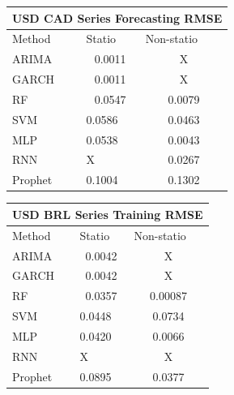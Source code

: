 \documentclass[10pt,twocolumn,letterpaper]{article}
\begin{document}
	\begin{table}[h]
		\label{table:usdcadforecastRMSE}
		\centering
		\begin{tabular}{|lll|}
			\hline
			\multicolumn{3}{|c|}{USD CAD Series Forecasting RMSE}                                                  \\ \hline
			\multicolumn{1}{|l|}{Method}  & \multicolumn{1}{l|}{Statio} & Non-statio             \\ \hline
			\multicolumn{1}{|l|}{ARIMA}   & \multicolumn{1}{c|}{0.0011}       & \multicolumn{1}{c|}{X} \\ \hline
			\multicolumn{1}{|l|}{GARCH}   & \multicolumn{1}{c|}{0.0011}       & \multicolumn{1}{c|}{X} \\ \hline
			\multicolumn{1}{|l|}{RF}      & \multicolumn{1}{c|}{0.0547}       & \multicolumn{1}{c|}{0.0079}  \\ \hline
			\multicolumn{1}{|l|}{SVM}     & \multicolumn{1}{l|}{0.0586}       & \multicolumn{1}{c|}{0.0463}  \\ \hline
			\multicolumn{1}{|l|}{MLP}     & \multicolumn{1}{l|}{0.0538}       & \multicolumn{1}{c|}{0.0043}  \\ \hline
			\multicolumn{1}{|l|}{RNN}     & \multicolumn{1}{l|}{X}       & \multicolumn{1}{c|}{0.0267}  \\ \hline
			\multicolumn{1}{|l|}{Prophet} & \multicolumn{1}{l|}{0.1004}       & \multicolumn{1}{c|}{0.1302}  \\ \hline
		\end{tabular}
	\end{table}
	
	\begin{table}[h]\label{table:usdbrltrainingRMSE}
		\centering
		\begin{tabular}{|lll|}
			\hline
			\multicolumn{3}{|c|}{USD BRL Series Training RMSE}                                                  \\ \hline
			\multicolumn{1}{|l|}{Method}  & \multicolumn{1}{l|}{Statio} & Non-statio             \\ \hline
			\multicolumn{1}{|l|}{ARIMA}   & \multicolumn{1}{c|}{0.0042}       & \multicolumn{1}{c|}{X} \\ \hline
			\multicolumn{1}{|l|}{GARCH}   & \multicolumn{1}{c|}{0.0042}       & \multicolumn{1}{c|}{X} \\ \hline
			\multicolumn{1}{|l|}{RF}      & \multicolumn{1}{c|}{0.0357}       & \multicolumn{1}{c|}{0.00087}  \\ \hline
			\multicolumn{1}{|l|}{SVM}     & \multicolumn{1}{l|}{0.0448}       & \multicolumn{1}{c|}{0.0734}  \\ \hline
			\multicolumn{1}{|l|}{MLP}     & \multicolumn{1}{l|}{0.0420}       & \multicolumn{1}{c|}{0.0066}  \\ \hline
			\multicolumn{1}{|l|}{RNN}     & \multicolumn{1}{l|}{X}       & \multicolumn{1}{c|}{X}  \\ \hline
			\multicolumn{1}{|l|}{Prophet} & \multicolumn{1}{l|}{0.0895}       & \multicolumn{1}{c|}{0.0377}  \\ \hline
		\end{tabular}
	\end{table}
	
\end{document}
